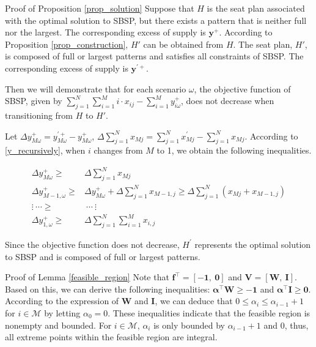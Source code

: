 \begin{pf}{Proof of Proposition \ref{prop_solution}}
Suppose that $H$ is the seat plan associated with the optimal solution to SBSP, but there exists a pattern that is neither full nor the largest. The corresponding excess of supply is $\mathbf{y}^{+}$. According to Proposition \ref{prop_construction}, $H{'}$ can be obtained from $H$. The seat plan, $H{'}$, is composed of full or largest patterns and satisfies all constraints of SBSP. The corresponding excess of supply is $\mathbf{y}^{'+}$.

Then we will demonstrate that for each scenario $\omega$, the objective function of SBSP, given by $\sum_{j =1}^{N} \sum_{i=1}^M i \cdot x_{ij} - \sum_{i = 1}^{M} y_{i \omega}^{+}$, does not decrease when transitioning from $H$ to $H'$.

Let $\Delta y_{M \omega}^{+} = y_{M \omega}^{'+} - y_{M \omega}^{+}$, $\Delta \sum_{j=1}^{N} x_{Mj} = \sum_{j=1}^{N} x_{Mj}^{'} - \sum_{j=1}^{N} x_{Mj}$. According to \eqref{y_recursively}, when $i$ changes from $M$ to 1, we obtain the following inequalities.

\begin{align*}
  \Delta y_{M \omega}^{+} \geq & \Delta \sum_{j=1}^{N} x_{Mj} \\
  \Delta y_{M-1, \omega}^{+} \geq & \Delta y_{M \omega}^{+} + \Delta \sum_{j=1}^{N} x_{M-1,j} \geq \Delta \sum_{j=1}^{N} (x_{Mj} + x_{M-1,j}) \\
  \vdots ~\cdots \geq & ~\cdots ~\vdots \\
  \Delta y_{1, \omega}^{+} \geq & \Delta \sum_{j=1}^{N} \sum_{i=1}^{M} x_{i,j}
\end{align*}

Since the objective function does not decrease, $H^{'}$ represents the optimal solution to SBSP and is composed of full or largest patterns.
\end{pf}

\begin{pf}{Proof of Lemma \ref{feasible_region}}
Note that $\mathbf{f}^{\intercal} = [-\mathbf{1},~\mathbf{0}]$ and $\mathbf{V} = [\mathbf{W},~\mathbf{I}]$. Based on this, we can derive the following inequalities: $\bm{\alpha}^{\intercal} \mathbf{W} \geq -\mathbf{1}$ and $\bm{\alpha}^{\intercal} \mathbf{I} \geq \mathbf{0}$. According to the expression of $\mathbf{W}$ and $\mathbf{I}$, we can deduce that $0 \leq \alpha_i \leq \alpha_{i-1} +1$ for $i \in \mathcal{M}$ by letting $\alpha_0 = 0$. These inequalities indicate that the feasible region is nonempty and bounded. For $i \in \mathcal{M}$, $\alpha_{i}$ is only bounded by $\alpha_{i-1}+1$ and $0$, thus, all extreme points within the feasible region are integral.
\end{pf}

